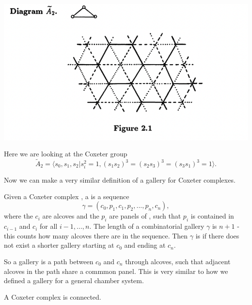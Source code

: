 \documentclass[11pt]{article}
\begin{document}
\includegraphics[scale=0.6]{Screenshot 2023-02-20 at 14.12.15.1.png}\\

\begin{example}
   Here we are looking at the Coxeter group 
    \[\tilde{A}_2=\langle s_0,s_1,s_2|s_i^2=1, (s_1s_2)^3=(s_2s_3)^3=(s_3s_1)^3=1\rangle.\]
\end{example}

Now we can make a very similar definition of a gallery for Coxeter complexes.

\begin{definition}
    Given a Coxeter complex \sg, a  is a sequence
    \[\gamma = (c_0,p_1,c_1,p_2,...,p_n,c_n),\]
    where the $c_i$ are alcoves and the $p_i$ are panels of \sg, such that $p_i$ is contained in $c_{i-1}$ and $c_{i}$ for all $i-1,...,n$. The length of a combinatorial gallery $\gamma$ is $n+1$ - this counts how many alcoves there are in the sequence. Then $\gamma$ is  if there does not exist a shorter gallery starting at $c_0$ and ending at $c_n$. 
\end{definition}

So a gallery is a path between $c_0$ and $c_n$ through alcoves, such that adjacent alcoves in the path share a commmon panel. This is very similar to how we defined a gallery for a general chamber system. 

\begin{lemma}
    A Coxeter complex is connected.
\end{lemma}
\end{document}
